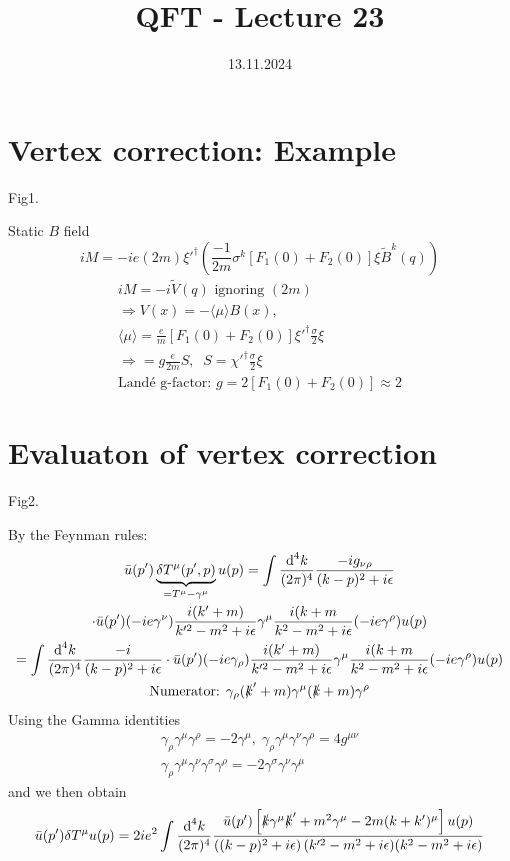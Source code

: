 \documentclass[]{scrartcl}
\title{QFT - Lecture 23}
\author{}
\date{13.11.2024}
\begin{document}
\maketitle
\newpage
\tableofcontents
\newpage

\section{Vertex correction: Example} 

Fig1.

Static $B$ field
\begin{equation}
	iM = -ie (2m) \xi'^\dagger \left(\frac{-1}{2m}\sigma^k \left[F_1(0) + F_2(0)\right] \xi \tilde{B}^k(q)\right)
\end{equation}
\begin{gather}
	iM = -i\tilde{V}(q) \text{ ignoring $(2m)$}\\
	\Rightarrow V(x) = -\langle \mu \rangle B(x),\\ \langle\mu\rangle = \frac{e}{m}\left[F_1(0)+F_2(0)\right]\xi'^\dagger \frac{\sigma}{2}\xi\\
	\Rightarrow = g\frac{e}{2m}S,\;\; S = \chi'^\dagger \frac{\sigma}{2}\xi\\
	\text{Landé g-factor: } g=2\left[F_1(0) + F_2(0)\right] \approx 2
\end{gather}

\section{Evaluaton of vertex correction}

Fig2.

By the Feynman rules:
\begin{gather}
	\bar u(p') \underbrace{\delta T^\mu(p',p)}_{= T^\mu - \gamma^\mu}u(p) = \int\frac{\text d^4k}{(2\pi)^4}\frac{-ig_{\nu\rho}}{(k-p)^2 + i\epsilon}\\
	\cdot \bar u (p') (-ie\gamma^\nu) \frac{i(k'+m)}{k'^2 -m^2 + i\epsilon}\gamma^\mu \frac{i(k+m}{k^2 - m^2 + i\epsilon}(-ie\gamma^\rho) u(p)\\ %
	= \int\frac{\text d^4k}{(2\pi)^4}\frac{-i}{(k-p)^2 + i\epsilon}
	\cdot \bar u (p') (-ie\gamma_\rho) \frac{i(k'+m)}{k'^2 -m^2 + i\epsilon}\gamma^\mu \frac{i(k+m}{k^2 - m^2 + i\epsilon}(-ie\gamma^\rho) u(p)\\
	\text{Numerator: } \gamma_\rho(\slashed k' + m) \gamma^\mu (\slashed k + m)\gamma^\rho
\end{gather}
Using the Gamma identities
\begin{gather}
	\gamma_\rho \gamma^\mu \gamma^\rho = -2\gamma^\mu, \; \gamma_\rho\gamma^\mu\gamma^\nu\gamma^\rho = 4g^{\mu\nu}\\
	\gamma_\rho\gamma^\mu\gamma^\nu\gamma^\sigma\gamma^\rho = -2\gamma^\sigma\gamma^\nu\gamma^\mu
\end{gather}
and we then obtain
\begin{gather}
	\bar u(p')\delta T^\mu u(p) = 2ie^2\int\frac{\text d^4k}{(2\pi)^4}\frac{\bar u(p')\left[\slashed k \gamma^\mu \slashed k' + m^2\gamma^\mu - 2m(k+k')^\mu \right] u(p)}{\left((k-p)^2 + i\epsilon\right)(k'^2 - m^2 + i\epsilon)(k^2-m^2+i\epsilon)}
\end{gather}
\end{document}
